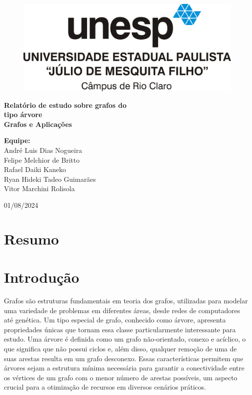 \documentclass[12pt, a4paper]{scrreprt}
\begin{document}
\begin{titlepage}
    \centering
    \begin{figure}[h]
        \centering
        \includegraphics[width=.75\textwidth]{src/logo_unesp.jpg}
        \label{fig:logo_unesp}
    \end{figure}
    \vfill
    \Huge\textbf{Relatório de estudo sobre grafos do \\ tipo árvore}\\[1.5cm]
    \Large\textbf{Grafos e Aplicações}\\[1.5cm]
    \vfill
    \begin{flushleft}
        \textbf{Equipe:}\\
        \hspace{1.5cm}André Luis Dias Nogueira \\ 
        \hspace{1.5cm}Felipe Melchior de Britto \\
        \hspace{1.5cm}Rafael Daiki Kaneko \\
        \hspace{1.5cm}Ryan Hideki Tadeo Guimarães \\
        \hspace{1.5cm}Vitor Marchini Rolisola \\
    \end{flushleft}
    \vfill
    01/08/2024\\
\end{titlepage}

\tableofcontents
\newpage

\chapter{Resumo}

\chapter{Introdução}
Grafos são estruturas fundamentais em teoria dos grafos, utilizadas para modelar uma variedade de problemas em diferentes áreas, desde redes de computadores até genética. Um tipo especial de grafo, conhecido como árvore, apresenta propriedades únicas que tornam essa classe particularmente interessante para estudo. Uma árvore é definida como um grafo não-orientado, conexo e acíclico, o que significa que não possui ciclos e, além disso, qualquer remoção de uma de suas arestas resulta em um grafo desconexo. Essas características permitem que árvores sejam a estrutura mínima necessária para garantir a conectividade entre os vértices de um grafo com o menor número de arestas possíveis, um aspecto crucial para a otimização de recursos em diversos cenários práticos.
\end{document}
